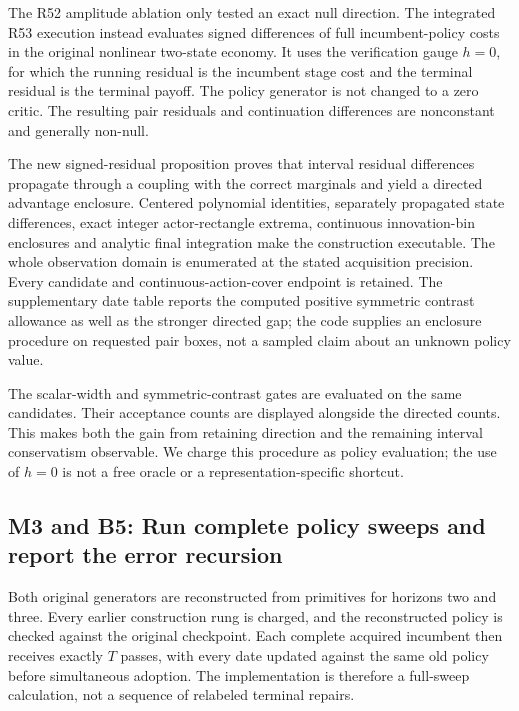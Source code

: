 \documentclass[ecta,nameyear,draft]{econsocart}
\begin{document}
The R52 amplitude ablation only tested an exact null direction. The
integrated R53 execution instead evaluates signed differences of full
incumbent-policy costs in the original nonlinear two-state economy. It
uses the verification gauge \(h=0\), for which the running residual is
the incumbent stage cost and the terminal residual is the terminal
payoff. The policy generator is not changed to a zero critic. The
resulting pair residuals and continuation differences are nonconstant
and generally non-null.

The new signed-residual proposition proves that interval residual
differences propagate through a coupling with the correct marginals and
yield a directed advantage enclosure. Centered polynomial identities,
separately propagated state differences, exact integer actor-rectangle
extrema, continuous innovation-bin enclosures and analytic final
integration make the construction executable. The whole observation
domain is enumerated at the stated acquisition precision. Every
candidate and continuous-action-cover endpoint is retained. The
supplementary date table reports the computed positive symmetric
contrast allowance as well as the stronger directed gap; the code
supplies an enclosure procedure on requested pair boxes, not a sampled
claim about an unknown policy value.

The scalar-width and symmetric-contrast gates are evaluated on the same
candidates. Their acceptance counts are displayed alongside the directed
counts. This makes both the gain from retaining direction and the
remaining interval conservatism observable. We charge this procedure as
policy evaluation; the use of \(h=0\) is not a free oracle or a
representation-specific shortcut.

\hypertarget{m3-and-b5-run-complete-policy-sweeps-and-report-the-error-recursion}{%
\subsection{M3 and B5: Run complete policy sweeps and report the error
recursion}\label{m3-and-b5-run-complete-policy-sweeps-and-report-the-error-recursion}}

Both original generators are reconstructed from primitives for horizons
two and three. Every earlier construction rung is charged, and the
reconstructed policy is checked against the original checkpoint. Each
complete acquired incumbent then receives exactly \(T\) passes, with
every date updated against the same old policy before simultaneous
adoption. The implementation is therefore a full-sweep calculation, not
a sequence of relabeled terminal repairs.
\end{document}
